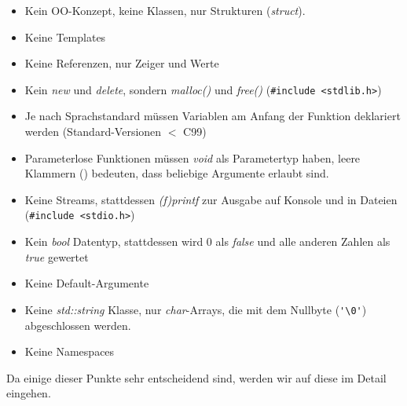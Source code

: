 \documentclass[
  accentcolor=tud1c,	%
  colorbacktitle,		%
  inverttitle,			%
  german,				%
  twoside
]{tudexercise}
\begin{document}
\begin{itemize}
	\item Kein OO-Konzept, keine Klassen, nur Strukturen (\emph{struct}).
	\item Keine Templates
	\item Keine Referenzen, nur Zeiger und Werte
	\item Kein \emph{new} und \emph{delete}, sondern \emph{malloc()} und \emph{free()} (\verb|#include <stdlib.h>|)
	\item Je nach Sprachstandard müssen Variablen am Anfang der Funktion deklariert werden (Standard-Versionen $<$ C99)
	\item Parameterlose Funktionen müssen \emph{void} als Parametertyp haben, leere Klammern () bedeuten, dass beliebige Argumente erlaubt sind.
	\item Keine Streams, stattdessen \emph{(f)printf} zur Ausgabe auf Konsole und in Dateien (\verb|#include <stdio.h>|)
	\item Kein \emph{bool} Datentyp, stattdessen wird 0 als \emph{false} und alle anderen Zahlen als \emph{true} gewertet
	\item Keine Default-Argumente
	\item Keine \emph{std::string} Klasse, nur \emph{char}-Arrays, die mit dem Nullbyte (\verb|'\0'|) abgeschlossen werden.
	\item Keine Namespaces
\end{itemize}

Da einige dieser Punkte sehr entscheidend sind, werden wir auf diese im Detail eingehen.
\end{document}
